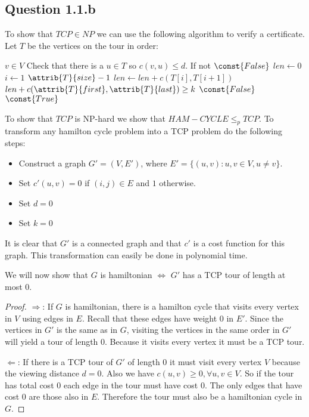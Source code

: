 \documentclass{sig-alternate}
\begin{document}
\subsection*{Question 1.1.b}
To show that $TCP\in NP$ we can use the following algorithm to verify a
certificate. Let $T$ be the vertices on the tour in order:

\begin{codebox}
\li \For $v\in V$
\li \Do
        Check that there is a $u\in T$ so $c(v, u) \le d$.
\li     If not \Return $\const{False}$
    \End
\li $len \gets 0$
\li \For $i \gets 1$ \To $\attrib{T}{size} - 1$
\li \Do
        $len \gets len + c(T[i], T[i+1])$
    \End
\li \If $len + c(\attrib{T}{first}, \attrib{T}{last}) \ge k$
\li \Then
        \Return $\const{False}$
\li \Else
        \Return $\const{True}$
    \End
\end{codebox}

To show that $TCP$ is NP-hard we show that $HAM-CYCLE \le_p TCP$.
To transform any hamilton cycle problem into a TCP problem do the following
steps:

\begin{itemize}
\item Construct a graph $G' = (V, E')$, where
    $E' = \{(u,v) : u,v\in V, u\ne v\}$.
\item Set $c'(u,v) = 0$ if $(i,j)\in E$ and $1$ otherwise.
\item Set $d=0$
\item Set $k=0$
\end{itemize}

It is clear that $G'$ is a connected graph and that $c'$ is a cost function
for this graph. This transformation can easily be done in polynomial time.

We will now show that $G$ is hamiltonian $\Leftrightarrow$ $G'$ has a TCP tour
of length at most $0$.

\begin{proof}
$\Rightarrow$: If $G$ is hamiltonian, there is a hamilton cycle that visits
every vertex in $V$ using edges in $E$. Recall that these edges have weight $0$
in $E'$. Since the vertices in $G'$ is the same as in $G$, visiting the
vertices in the same order in $G'$ will yield a tour of length $0$. Because it
visits every vertex it must be a TCP tour.

$\Leftarrow$: If there is a TCP tour of $G'$ of length $0$ it must visit every
vertex $V$ because the viewing distance $d=0$. Also we have
$c(u,v) \ge 0, \forall u,v\in V$. So if the tour has total cost $0$ each edge
in the tour must have cost $0$. The only edges that have cost $0$ are those
also in $E$. Therefore the tour must also be a hamiltonian cycle in $G$.
\end{proof}
\end{document}
